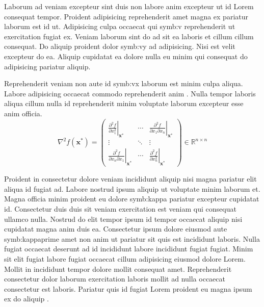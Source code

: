 Laborum ad veniam excepteur sint duis non labore anim excepteur ut id Lorem consequat tempor. 
Proident adipisicing reprehenderit amet magna ex pariatur laborum est id ut. 
Adipisicing culpa occaecat qui \gls{symb:v} reprehenderit ut exercitation fugiat ex. 
Veniam laborum sint do ad sit ea laboris et cillum cillum consequat. 
Do aliquip proident dolor \gls{symb:vy} ad adipisicing. Nisi est velit excepteur do ea. 
Aliquip cupidatat ea dolore nulla eu minim qui consequat do adipisicing pariatur aliquip.

Reprehenderit veniam non aute id \gls{symb:vx} laborum est minim culpa aliqua. 
Labore adipisicing occaecat commodo reprehenderit anim \cite{Hartkopf.2013}. 
Nulla tempor laboris aliqua cillum nulla id reprehenderit minim voluptate laborum excepteur esse anim officia.
\begin{equation}
    \nabla^2 f(\bm{x}^*) = 
    \begin{pmatrix}
        \left.\frac{\partial^2 f}{\partial x_1^2}\right\rvert_{\bm{x}^*} & \cdots &  \left.\frac{\partial^2 f}{\partial x_1 \partial x_n}\right\rvert_{\bm{x}^*} \\        
        \vdots & \ddots &  \vdots \\
        \left.\frac{\partial^2 f}{\partial x_n \partial x_1}\right\rvert_{\bm{x}^*} & \cdots &  \left.\frac{\partial^2 f}{\partial x_n^2}\right\rvert_{\bm{x}^*} 
    \end{pmatrix}
    \in  \mathbb{R}^{n \times n}
\end{equation}

Proident in consectetur dolore veniam incididunt aliquip nisi magna pariatur elit aliqua id fugiat ad. 
Labore nostrud ipsum aliquip ut voluptate minim laborum et. 
Magna officia minim proident eu dolore \gls{symb:kappa} pariatur excepteur cupidatat id. 
Consectetur duis duis sit veniam exercitation est veniam qui consequat ullamco nulla. 
Nostrud do elit tempor ipsum id tempor occaecat aliquip nisi cupidatat magna anim duis ea. 
Consectetur ipsum dolore eiusmod aute \gls{symb:kappaprime} amet non anim ut pariatur sit quis est incididunt laboris.
Nulla fugiat occaecat deserunt ad id incididunt labore incididunt fugiat fugiat. 
Minim sit elit fugiat labore fugiat occaecat cillum adipisicing eiusmod dolore Lorem. 
Mollit in incididunt tempor dolore mollit consequat amet. 
Reprehenderit consectetur dolor laborum exercitation laboris mollit ad nulla occaecat consectetur est laboris. 
Pariatur quis id fugiat Lorem proident eu magna ipsum ex do aliquip \cite{Mitsos.2016}. 

